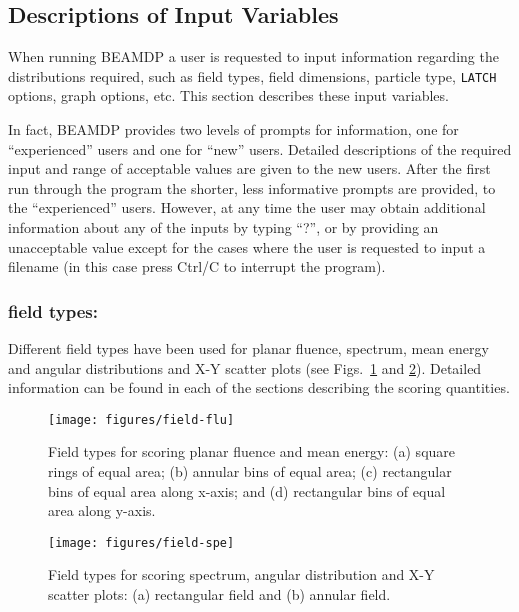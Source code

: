 \documentclass[12pt,twoside]{article}
\begin{document}
\subsection{Descriptions of Input Variables}

When running BEAMDP a user is requested to input information
regarding the distributions required, such as field types, field
dimensions, particle type, \verb+LATCH+ options, graph options, etc. This
section describes these input variables.

\noindent
In fact, BEAMDP provides two levels of prompts for information, one for
``experienced'' users and one for ``new'' users. Detailed descriptions of
the required input and range of acceptable values are given to the new
users. After the first run through the program the shorter, less
informative prompts are provided, to the ``experienced'' users. However,
at any time the user may obtain additional information about any of the
inputs by typing ``?'', or by providing an unacceptable value except for the
cases where the user is requested to input a filename (in this case press
Ctrl/C to interrupt the program).

\noindent
\subsubsection{field types:}

\noindent
Different field types have been used for planar fluence, spectrum, mean
energy and angular distributions and X-Y scatter plots
(see Figs.~\ref{fig-field-flu} and
\ref{fig-field-spe}). Detailed information can be found in each of the
sections describing the scoring quantities.

\begin{figure}[htbp]
\begin{center}
\vspace*{1cm}
\texttt{[image: figures/field-flu]}
\caption[]
{Field types for scoring planar fluence and mean energy: (a) square rings
of equal area; (b) annular bins of equal area; (c) rectangular bins
of equal area along x-axis; and (d) rectangular bins of equal
area along y-axis. }
\label{fig-field-flu}
\end{center}
\end{figure}

\begin{figure}[htbp]
\begin{center}
\texttt{[image: figures/field-spe]}
\caption[]
{Field types for scoring spectrum, angular distribution and X-Y scatter plots:
(a) rectangular field and (b) annular field. }
\label{fig-field-spe}
\end{center}
\end{figure}
\end{document}
